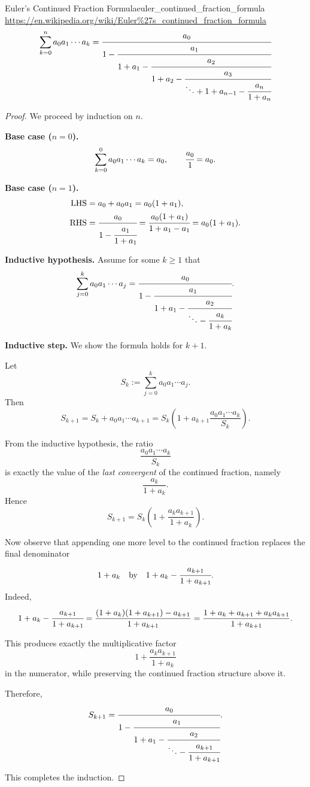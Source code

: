 \documentclass[a4paper]{article}
\begin{document}
\begin{mytheorem}{Euler's Continued Fraction Formula}{euler_continued_fraction_formula}
  \url{https://en.wikipedia.org/wiki/Euler%27s_continued_fraction_formula}
  \[
    \sum_{k=0}^{n} a_0 a_1 \cdots a_k
    =
    \cfrac{a_0}{1 - \cfrac{a_{1}}{1 + a_1 - \cfrac{a_2}{1 + a_2 -
          \cfrac{a_3}{\ddots +  1 + a_{n-1} - \cfrac{a_{n}}{1 + a_n}}}}}
  \]
  \begin{proof}
    We proceed by induction on $n$.

    \textbf{Base case ($n=0$).}
    \[
      \sum_{k=0}^0 a_0 a_1 \cdots a_k = a_0,
      \qquad
      \cfrac{a_0}{1} = a_0.
    \]

    \textbf{Base case ($n=1$).}
    \begin{align*}
      \text{LHS} & = a_0 + a_0 a_1 = a_0(1+a_1),         \\
      \text{RHS} & = \cfrac{a_0}{1 - \cfrac{a_1}{1+a_1}}
      = \cfrac{a_0(1+a_1)}{1+a_1-a_1}
      = a_0(1+a_1).
    \end{align*}

    \textbf{Inductive hypothesis.}
    Assume for some $k \ge 1$ that
    \[
      \sum_{j=0}^{k} a_0 a_1 \cdots a_j
      =
      \cfrac{a_0}{1 - \cfrac{a_{1}}{1 + a_1 - \cfrac{a_2}{\ddots -
            \cfrac{a_{k}}{1 + a_k}}}}.
    \]

    \textbf{Inductive step.}
    We show the formula holds for $k+1$.

    Let
    \[
      S_k := \sum_{j=0}^{k} a_0 a_1 \cdots a_j.
    \]
    Then
    \[
      S_{k+1} = S_k + a_0 a_1 \cdots a_{k+1}
      = S_k\left(1 + a_{k+1}\frac{a_0 a_1 \cdots a_k}{S_k}\right).
    \]

    From the inductive hypothesis, the ratio
    \[
      \frac{a_0 a_1 \cdots a_k}{S_k}
    \]
    is exactly the value of the \emph{last convergent} of the continued fraction, namely
    \[
      \frac{a_k}{1+a_k}.
    \]
    Hence
    \[
      S_{k+1} = S_k\left(1 + \frac{a_k a_{k+1}}{1+a_k}\right).
    \]

    Now observe that appending one more level to the continued fraction replaces the final denominator
    \[
      1 + a_k
      \quad\text{by}\quad
      1 + a_k - \cfrac{a_{k+1}}{1+a_{k+1}}.
    \]
    Indeed,
    \[
      1 + a_k - \cfrac{a_{k+1}}{1+a_{k+1}}
      =
      \frac{(1+a_k)(1+a_{k+1}) - a_{k+1}}{1+a_{k+1}}
      =
      \frac{1 + a_k + a_{k+1} + a_k a_{k+1}}{1+a_{k+1}}.
    \]

    This produces exactly the multiplicative factor
    \[
      1 + \frac{a_k a_{k+1}}{1+a_k}
    \]
    in the numerator, while preserving the continued fraction structure above it.

    Therefore,
    \[
      S_{k+1}
      =
      \cfrac{a_0}{1 - \cfrac{a_{1}}{1 + a_1 - \cfrac{a_2}{\ddots -
            \cfrac{a_{k+1}}{1 + a_{k+1}}}}}.
    \]

    This completes the induction.
  \end{proof}
\end{mytheorem}
\end{document}
